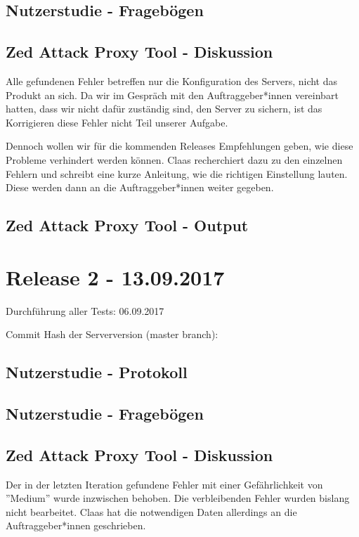 \documentclass[accentcolor=tud0b,12pt,paper=a4]{tudreport}
\begin{document}
\subsection*{Nutzerstudie - Fragebögen}


\subsection*{Zed Attack Proxy Tool - Diskussion}
Alle gefundenen Fehler betreffen nur die Konfiguration des Servers, nicht das Produkt an sich. Da wir im Gespräch mit den Auftraggeber*innen vereinbart hatten, dass wir nicht dafür zuständig sind, den Server zu sichern, ist das Korrigieren diese Fehler nicht Teil unserer Aufgabe.

Dennoch wollen wir für die kommenden Releases Empfehlungen geben, wie diese Probleme verhindert werden können. Claas recherchiert dazu zu den einzelnen Fehlern und schreibt eine kurze Anleitung, wie die richtigen Einstellung lauten. Diese werden dann an die Auftraggeber*innen weiter gegeben.

\subsection*{Zed Attack Proxy Tool - Output}



\section*{Release 2 - 13.09.2017}
Durchführung aller Tests: 06.09.2017

Commit Hash der Serverversion (master branch): 

\subsection*{Nutzerstudie - Protokoll}


\subsection*{Nutzerstudie - Fragebögen}


\subsection*{Zed Attack Proxy Tool - Diskussion}
Der in der letzten Iteration gefundene Fehler mit einer Gefährlichkeit von ''Medium'' wurde inzwischen behoben. Die verbleibenden Fehler wurden bislang nicht bearbeitet. Claas hat die notwendigen Daten allerdings an die Auftraggeber*innen geschrieben.
\end{document}
